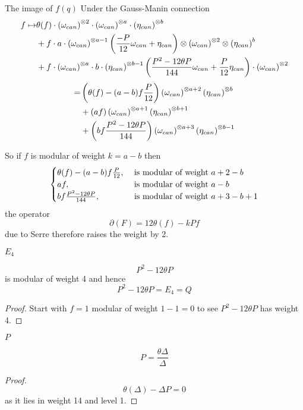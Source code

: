 \begin{frame}{The image of $f(q)$}
    Under the Gauss-Manin connection
    \begin{align*}
        f\mapsto
&\theta(f) \cdot\left(\omega_{can}\right)^{\otimes 2} \cdot\left(\omega_{can}\right)^{\otimes a} \cdot\left(\eta_{can}\right)^{\otimes b} \\
&+f \cdot a \cdot\left(\omega_{can}\right)^{\otimes a-1}\left(\frac{-P}{12} \omega_{can}+\eta_{can}\right) \otimes\left(\omega_{can}\right)^{\otimes 2} \otimes\left(\eta_{can}\right)^{b} \\
&+f \cdot\left(\omega_{can}\right)^{\otimes a} \cdot b \cdot\left(\eta_{can}\right)^{\otimes b-1}\left(\frac{P^{2}-12 \theta P}{144} \omega_{can}+\frac{P}{12} \eta_{can}\right) \cdot\left(\omega_{can}\right)^{\otimes 2}
    \end{align*}
    \begin{align*}
        =& \left( \theta(f) - (a-b)f \frac P{12}\right)\left(\omega_{can}\right)^{\otimes a+ 2}\left(\eta_{can}\right)^{\otimes b}\\
    &+ \left( af \right)\left(\omega_{can}\right)^{\otimes a+ 1}\left(\eta_{can}\right)^{\otimes b + 1}\\
    &+ \left( bf \frac{P^{2}-12 \theta P}{144} \right)\left(\omega_{can}\right)^{\otimes a+ 3}\left(\eta_{can}\right)^{\otimes b -1}
    \end{align*}

\end{frame}

\begin{frame}
    So if $f$ is modular of weight $k = a-b$ then
    \[
    \begin{cases}
        \theta(f) - (a-b)f \frac P{12},& \text{ is modular of weight } a+ 2 - b\\
     af,& \text{ is modular of weight } a - b \\
    bf \frac{P^{2}-12 \theta P}{144},& \text{ is modular of weight } a + 3 - b + 1
\end{cases}
    \] 
    the operator
    \[ \partial (F ) = 12 \theta (f ) - k P f\]
    due to Serre therefore raises the weight by 2.
    
\end{frame}

\begin{frame}{$E_4$}
    \begin{corollary}
        \[P^2 - 12 \theta P\]
        is modular of weight 4 and hence
        \[P^2 - 12 \theta P = E_4 = Q\]
    \end{corollary}
    \begin{proof}
        Start with $f=1$ modular of weight $1 -1 = 0$ to see $P^2 - 12 \theta P$ has weight 4.
    \end{proof}
\end{frame}

\begin{frame}{$P$}
    \begin{corollary}[Deligne]
        \[P =  \frac{\theta \Delta}{\Delta}\]
    \end{corollary}
    \begin{proof}
        \[ \theta(\Delta) -  \Delta P =  0\]
        as it lies in weight 14 and level 1.

    \end{proof}
\end{frame}



